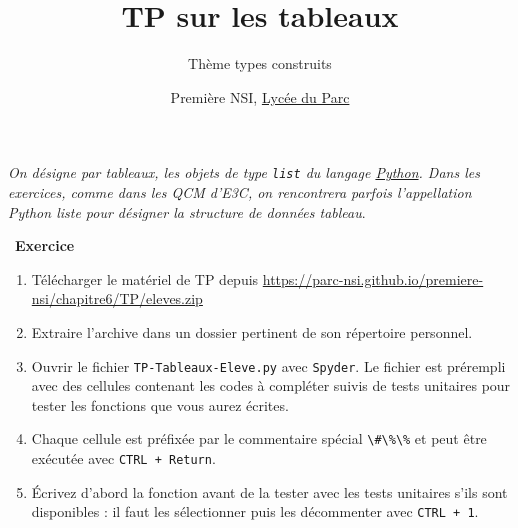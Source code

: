 \documentclass[
  10pt,
]{article}
\title{TP sur les tableaux}
\subtitle{Thème types construits}
\author{Première NSI, \href{https://frederic-junier.org/}{Lycée du
Parc}}
\date{}
\newcommand{\passthrough}[1]{#1}
\providecommand{\tightlist}{%
  \setlength{\itemsep}{0pt}\setlength{\parskip}{0pt}}
\newcounter{exo}
\newenvironment{exercice}[1]
{\par \medskip   \addtocounter{exo}{1} \noindent  
\begin{bclogo}[arrondi =0.1,   noborder = true, logo=\bccrayon, marge=4]{~\textbf{Exercice} \textbf{\theexo} {\itshape #1} }  \par}
{
\end{bclogo}
 \par \bigskip }
\newcounter{def}
\begin{document}
\maketitle

\emph{On désigne par tableaux, les objets de type
\passthrough{\lstinline!list!} du langage
\href{https://docs.python.org/3/tutorial/datastructures.html}{Python}.
Dans les exercices, comme dans les QCM d'E3C, on rencontrera parfois
l'appellation Python liste pour désigner la structure de données
tableau}.

\begin{exercice}{}

\begin{enumerate}
\def\labelenumi{\arabic{enumi}.}
\tightlist
\item
  Télécharger le matériel de TP depuis
  \url{https://parc-nsi.github.io/premiere-nsi/chapitre6/TP/eleves.zip}
\item
  Extraire l'archive dans un dossier pertinent de son répertoire
  personnel.
\item
  Ouvrir le fichier \passthrough{\lstinline!TP-Tableaux-Eleve.py!} avec
  \passthrough{\lstinline!Spyder!}. Le fichier est prérempli avec des
  cellules contenant les codes à compléter suivis de tests unitaires
  pour tester les fonctions que vous aurez écrites.
\item
  Chaque cellule est préfixée par le commentaire spécial
  \passthrough{\lstinline!\#\%\%!} et peut être exécutée avec
  \passthrough{\lstinline!CTRL + Return!}.
\item
  Écrivez d'abord la fonction avant de la tester avec les tests
  unitaires s'ils sont disponibles : il faut les sélectionner puis les
  décommenter avec \passthrough{\lstinline!CTRL + 1!}.
\end{enumerate}

\end{exercice}
\end{document}
